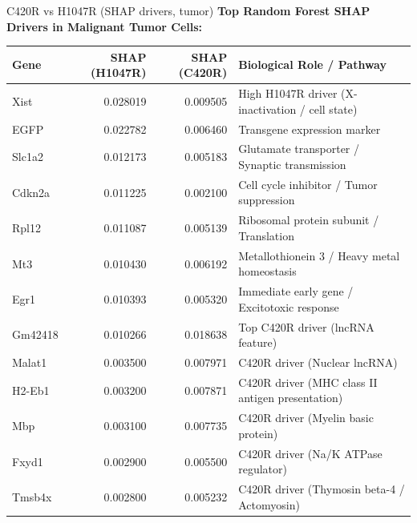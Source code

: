 \documentclass[10pt, aspectratio=169]{beamer}
\begin{document}
\begin{frame}{C420R vs H1047R (SHAP drivers, tumor)}
  \centering
  {\small \textbf{Top Random Forest SHAP Drivers in Malignant Tumor Cells:}}\par
  \vspace{0.15cm}
  \scriptsize
  \begin{tabular}{l r r p{6.5cm}}
    \toprule
    \textbf{Gene} & \textbf{SHAP (H1047R)} & \textbf{SHAP (C420R)} & \textbf{Biological Role / Pathway} \\
    \midrule
    Xist & 0.028019 & 0.009505 & High H1047R driver (X-inactivation / cell state) \\
    EGFP & 0.022782 & 0.006460 & Transgene expression marker \\
    Slc1a2 & 0.012173 & 0.005183 & Glutamate transporter / Synaptic transmission \\
    Cdkn2a & 0.011225 & 0.002100 & Cell cycle inhibitor / Tumor suppression \\
    Rpl12 & 0.011087 & 0.005139 & Ribosomal protein subunit / Translation \\
    Mt3 & 0.010430 & 0.006192 & Metallothionein 3 / Heavy metal homeostasis \\
    Egr1 & 0.010393 & 0.005320 & Immediate early gene / Excitotoxic response \\
    Gm42418 & 0.010266 & 0.018638 & Top C420R driver (lncRNA feature) \\
    Malat1 & 0.003500 & 0.007971 & C420R driver (Nuclear lncRNA) \\
    H2-Eb1 & 0.003200 & 0.007871 & C420R driver (MHC class II antigen presentation) \\
    Mbp & 0.003100 & 0.007735 & C420R driver (Myelin basic protein) \\
    Fxyd1 & 0.002900 & 0.005500 & C420R driver (Na/K ATPase regulator) \\
    Tmsb4x & 0.002800 & 0.005232 & C420R driver (Thymosin beta-4 / Actomyosin) \\
    \bottomrule
  \end{tabular}
\end{frame}
\end{document}

